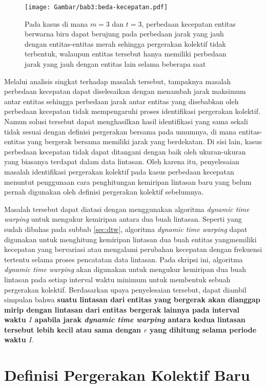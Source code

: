 \begin{figure}[t]
    \centering
    \texttt{[image: Gambar/bab3:beda-kecepatan.pdf]}
    \caption{Pada kasus di mana $m = 3$ dan $t = 3$, perbedaan kecepatan entitas berwarna biru dapat berujung pada perbedaan jarak yang jauh dengan entitas-entitas merah sehingga pergerakan kolektif tidak terbentuk, walaupun entitas tersebut hanya memiliki perbedaan jarak yang jauh dengan entitas lain selama beberapa saat}
    \label{bab3:masalah-kecepatan}
\end{figure}
    
Melalui analisis singkat terhadap masalah tersebut, tampaknya masalah perbedaan kecepatan dapat diselesaikan dengan menambah jarak maksimum antar entitas sehingga perbedaan jarak antar entitas yang disebabkan oleh perbedaan kecepatan tidak mempengaruhi proses identifikasi pergerakan kolektif. Namun solusi tersebut dapat menghasilkan hasil identifikasi yang sama sekali tidak sesuai dengan definisi pergerakan bersama pada umumnya, di mana entitas-entitas yang bergerak bersama memiliki jarak yang berdekatan. Di sisi lain, kasus perbedaan kecepatan tidak dapat ditangani dengan baik oleh ukuran-ukuran yang biasanya terdapat dalam data lintasan. Oleh karena itu, penyelesaian masalah identifikasi pergerakan kolektif pada kasus perbedaan kecepatan menuntut penggunaan cara penghitungan kemiripan lintasan baru yang belum pernah digunakan oleh definisi pergerakan kolektif sebelumnya.

Masalah tersebut dapat diatasi dengan menggunakan algoritma \textit{dynamic time warping} untuk mengukur kemiripan antara dua buah lintasan. Seperti yang sudah dibahas pada subbab \ref{sec:dtw}, algoritma \textit{dynamic time warping} dapat digunakan untuk menghitung kemiripan lintasan dua buah entitas yangmemiliki kecepatan yang bervariasi atau mengalami perubahan kecepatan dengan frekuensi tertentu selama proses pencatatan data lintasan. Pada skripsi ini, algoritma \textit{dynamic time warping} akan digunakan untuk mengukur kemiripan dua buah lintasan pada setiap interval waktu minimum untuk membentuk sebuah pergerakan kolektif. Berdasarkan upaya penyelesaian tersebut, dapat diambil simpulan bahwa \textbf{suatu lintasan dari entitas yang bergerak akan dianggap mirip dengan lintasan dari entitas bergerak lainnya pada interval waktu $I$ apabila jarak \textit{dynamic time warping} antara kedua lintasan tersebut lebih kecil atau sama dengan $r$ yang dihitung selama periode waktu $I$}. 

\section{Definisi Pergerakan Kolektif Baru}

